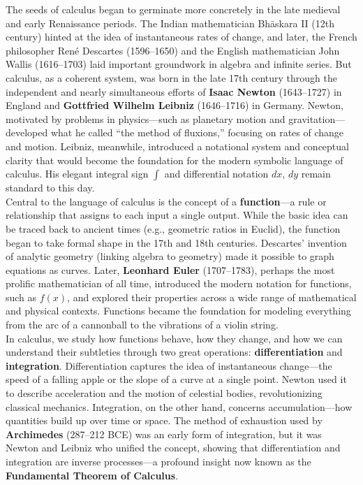 \documentclass{book}
\begin{document}
The seeds of calculus began to germinate more concretely in the late medieval and early Renaissance periods. The Indian mathematician Bhāskara II (12th century) hinted at the idea of instantaneous rates of change, and later, the French philosopher René Descartes (1596--1650) and the English mathematician John Wallis (1616--1703) laid important groundwork in algebra and infinite series. But calculus, as a coherent system, was born in the late 17th century through the independent and nearly simultaneous efforts of \textbf{Isaac Newton} (1643--1727) in England and \textbf{Gottfried Wilhelm Leibniz} (1646--1716) in Germany. Newton, motivated by problems in physics---such as planetary motion and gravitation---developed what he called ``the method of fluxions,'' focusing on rates of change and motion. Leibniz, meanwhile, introduced a notational system and conceptual clarity that would become the foundation for the modern symbolic language of calculus. His elegant integral sign $\int$ and differential notation $dx$, $dy$ remain standard to this day.\\

Central to the language of calculus is the concept of a \textbf{function}---a rule or relationship that assigns to each input a single output. While the basic idea can be traced back to ancient times (e.g., geometric ratios in Euclid), the function began to take formal shape in the 17th and 18th centuries. Descartes’ invention of analytic geometry (linking algebra to geometry) made it possible to graph equations as curves. Later, \textbf{Leonhard Euler} (1707--1783), perhaps the most prolific mathematician of all time, introduced the modern notation for functions, such as $f(x)$, and explored their properties across a wide range of mathematical and physical contexts. Functions became the foundation for modeling everything from the arc of a cannonball to the vibrations of a violin string.\\

In calculus, we study how functions behave, how they change, and how we can understand their subtleties through two great operations: \textbf{differentiation} and \textbf{integration}. Differentiation captures the idea of instantaneous change---the speed of a falling apple or the slope of a curve at a single point. Newton used it to describe acceleration and the motion of celestial bodies, revolutionizing classical mechanics. Integration, on the other hand, concerns accumulation---how quantities build up over time or space. The method of exhaustion used by \textbf{Archimedes} (287--212 BCE) was an early form of integration, but it was Newton and Leibniz who unified the concept, showing that differentiation and integration are inverse processes---a profound insight now known as the \textbf{Fundamental Theorem of Calculus}.\\
\end{document}

